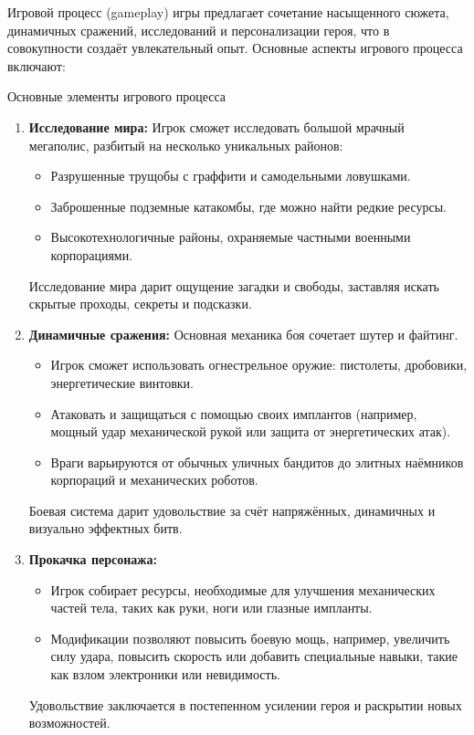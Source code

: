 \documentclass{article}
\begin{document}
Игровой процесс (gameplay) игры предлагает сочетание насыщенного сюжета, динамичных сражений, исследований и персонализации героя, что в совокупности создаёт увлекательный опыт. Основные аспекты игрового процесса включают:

Основные элементы игрового процесса
\begin{enumerate}
    \item \textbf{Исследование мира:}  
    Игрок сможет исследовать большой мрачный мегаполис, разбитый на несколько уникальных районов:
    \begin{itemize}
        \item Разрушенные трущобы с граффити и самодельными ловушками.
        \item Заброшенные подземные катакомбы, где можно найти редкие ресурсы.
        \item Высокотехнологичные районы, охраняемые частными военными корпорациями.
    \end{itemize}
    Исследование мира дарит ощущение загадки и свободы, заставляя искать скрытые проходы, секреты и подсказки.
    
    \item \textbf{Динамичные сражения:}  
    Основная механика боя сочетает шутер и файтинг.
    \begin{itemize}
        \item Игрок сможет использовать огнестрельное оружие: пистолеты, дробовики, энергетические винтовки.
        \item Атаковать и защищаться с помощью своих имплантов (например, мощный удар механической рукой или защита от энергетических атак).
        \item Враги варьируются от обычных уличных бандитов до элитных наёмников корпораций и механических роботов.
    \end{itemize}
    Боевая система дарит удовольствие за счёт напряжённых, динамичных и визуально эффектных битв.
    
    \item \textbf{Прокачка персонажа:}  
    \begin{itemize}
        \item Игрок собирает ресурсы, необходимые для улучшения механических частей тела, таких как руки, ноги или глазные импланты.
        \item Модификации позволяют повысить боевую мощь, например, увеличить силу удара, повысить скорость или добавить специальные навыки, такие как взлом электроники или невидимость.
    \end{itemize}
    Удовольствие заключается в постепенном усилении героя и раскрытии новых возможностей.
    

\end{enumerate}
\end{document}
